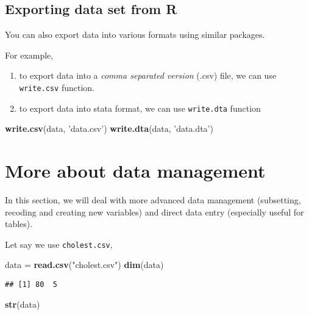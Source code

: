 \documentclass[]{book}
\newenvironment{Shaded}{\begin{snugshade}}{\end{snugshade}}
\newcommand{\KeywordTok}[1]{\textcolor[rgb]{0.13,0.29,0.53}{\textbf{{#1}}}}
\newcommand{\StringTok}[1]{\textcolor[rgb]{0.31,0.60,0.02}{{#1}}}
\newcommand{\NormalTok}[1]{{#1}}
\providecommand{\tightlist}{%
  \setlength{\itemsep}{0pt}\setlength{\parskip}{0pt}}
\theoremstyle{definition}
\theoremstyle{definition}
\theoremstyle{remark}
\begin{document}
\subsection{Exporting data set from R}\label{exporting-data-set-from-r}

You can also export data into various formats using similar packages.

For example,

\begin{enumerate}
\def\labelenumi{\arabic{enumi}.}
\tightlist
\item
  to export data into a \emph{comma separated version} (.csv) file, we
  can use \texttt{write.csv} function.
\item
  to export data into stata format, we can use \texttt{write.dta}
  function
\end{enumerate}

\begin{Shaded}
\begin{Highlighting}[]
\KeywordTok{write.csv}\NormalTok{(data, }\StringTok{'data.csv'}\NormalTok{)}
\KeywordTok{write.dta}\NormalTok{(data, }\StringTok{'data.dta'}\NormalTok{) }
\end{Highlighting}
\end{Shaded}

\section{More about data management}\label{more-about-data-management}

In this section, we will deal with more advanced data management
(subsetting, recoding and creating new variables) and direct data entry
(especially useful for tables).

Let say we use \texttt{cholest.csv},

\begin{Shaded}
\begin{Highlighting}[]
\NormalTok{data =}\StringTok{ }\KeywordTok{read.csv}\NormalTok{(}\StringTok{"cholest.csv"}\NormalTok{)}
\KeywordTok{dim}\NormalTok{(data)}
\end{Highlighting}
\end{Shaded}

\begin{verbatim}
## [1] 80  5
\end{verbatim}

\begin{Shaded}
\begin{Highlighting}[]
\KeywordTok{str}\NormalTok{(data)}
\end{Highlighting}
\end{Shaded}
\end{document}
